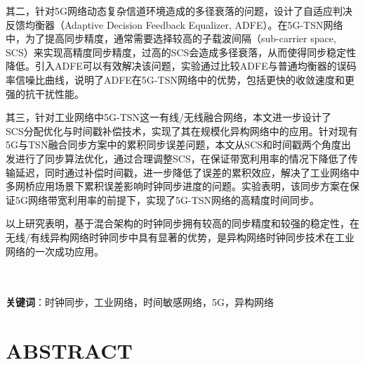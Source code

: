 \documentclass[UTF8,a4paper,12pt]{ctexart}
\numberwithin{equation}{section}
\begin{document}
其二，针对5G网络动态复杂信道环境造成的多径衰落的问题，设计了自适应判决反馈均衡器（Adaptive Decision Feedback Equalizer, ADFE）。在5G-TSN网络中，为了提高同步精度，通常需要选择较高的子载波间隔（sub-carrier space, SCS）来实现高精度同步精度，过高的SCS会造成多径衰落，从而使得同步稳定性降低。引入ADFE可以有效解决该问题，实验通过比较ADFE与普通均衡器的误码率信噪比曲线，说明了ADFE在5G-TSN网络中的优势，包括更快的收敛速度和更强的抗干扰性能。

其三，针对工业网络中5G-TSN这一有线/无线融合网络，本文进一步设计了\\SCS分配优化与时间戳补偿技术，实现了其在规模化异构网络中的应用。针对现有5G与TSN融合同步方案中的累积同步误差问题，本文从SCS和时间戳两个角度出发进行了同步算法优化，通过合理调整SCS，在保证带宽利用率的情况下降低了传输延迟，同时通过补偿时间戳，进一步降低了误差的累积效应，解决了工业网络中多网桥应用场景下累积误差影响时钟同步进度的问题。实验表明，该同步方案在保证5G网络带宽利用率的前提下，实现了5G-TSN网络的高精度时间同步。

以上研究表明，基于混合架构的时钟同步拥有较高的同步精度和较强的稳定性，在无线/有线异构网络时钟同步中具有显著的优势，是异构网络时钟同步技术在工业网络的一次成功应用。

\hspace{8mm}\\
~\\
\textbf{关键词}：时钟同步，工业网络，时间敏感网络，5G，异构网络\\

\newpage
{}
\section*{ABSTRACT}
\end{document}
